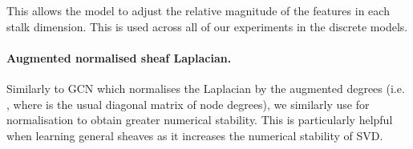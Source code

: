 \documentclass{article}
\begin{document}
This allows the model to adjust the relative magnitude of the features in each stalk dimension. This is used across all of our experiments in the discrete models. 

\paragraph{Augmented normalised sheaf Laplacian.} Similarly to GCN which normalises the Laplacian by the augmented degrees (i.e. , where  is the usual diagonal matrix of node degrees), we similarly use  for normalisation to obtain greater numerical stability. This is particularly helpful when learning general sheaves as it increases the numerical stability of SVD. 

\begin{table}[h]
    \centering
    \caption{Hyper-parameter ranges for the discrete and continous models.}
    \label{tab:hyper-range}
\end{table} 
\end{document}

